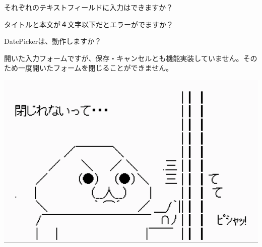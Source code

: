 \begin{starteritemize}
\item それぞれのテキストフィールドに入力はできますか？
\item タイトルと本文が４文字以下だとエラーがでますか？
\item DatePickerは、動作しますか？
\end{starteritemize}

開いた入力フォームですが、保存・キャンセルとも機能実装していません。そのため一度開いたフォームを閉じることができません。

\begin{reviewimage}[H]%
\includegraphics[width=0.7\maxwidth]{./images/03-todo-with-react/close.png}%
\label{image:03-todo-with-react:close}
\end{reviewimage}

\clearpage

